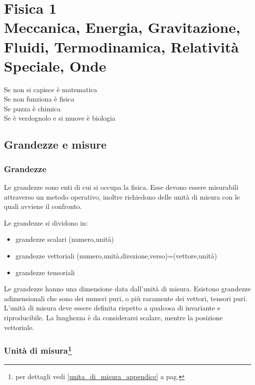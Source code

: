 \part[Fisica 1]{Fisica 1\\\vspace{1cm}\large{Meccanica, Energia, Gravitazione, Fluidi, Termodinamica, Relatività Speciale, Onde}}
\parttoc
\mtcskip


\begin{savequote}
Se non si capisce è matematica\\
Se non funziona è fisica\\
Se puzza è chimica\\
Se è verdognolo e si muove è biologia\\
\end{savequote}
\chapter{Grandezze e misure}
\minitoc
\section{Grandezze}
Le grandezze sono enti di cui si occupa la fisica. Esse devono essere misurabili attraverso un metodo operativo, inoltre richiedono delle unità di misura con le quali avviene il confronto.
\newline\par
Le grandezze si dividono in:
\begin{itemize}
\item{}grandezze scalari (numero,unità)
\item{}grandezze vettoriali
(numero,unità,direzione,verso)=(vettore,unità)
\item{}grandezze tensoriali
\end{itemize}
Le grandezze hanno una dimensione data dall'unità di misura. Esistono grandezze adimensionali che sono dei numeri puri, o più raramente dei vettori, tensori puri. L'unità di misura deve essere definita rispetto a qualcosa di invariante e riproducibile. La lunghezza è da considerarsi scalare, mentre la posizione vettoriale.
\section[Unità di misura]{Unità di misura\protect\footnote{per dettagli vedi \ref{unita_di_misura_appendice} a pag.\@\pageref{unita_di_misura_appendice}}}
